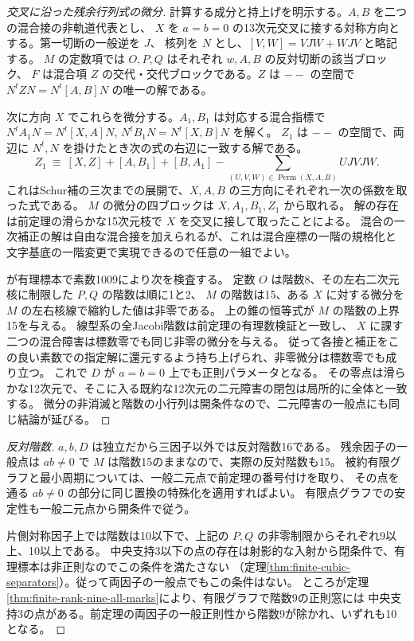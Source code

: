 \begin{proof}[交叉に沿った残余行列式の微分]
計算する成分と持上げを明示する。$A,B$ を二つの混合接の非軌道代表とし、
$X$ を $a=b=0$ の13次元交叉に接する対称方向とする。第一切断の一般逆を $J$、
核列を $N$ とし、$[V,W]=VJW+WJV$ と略記する。
$M$ の定数項では $O,P,Q$ はそれぞれ $w,A,B$ の反対切断の該当ブロック、
$F$ は混合項 $Z$ の交代・交代ブロックである。$Z$ は $--$ の空間で
$N^t ZN=N^t[A,B]N$ の唯一の解である。

次に方向 $X$ でこれらを微分する。$A_1,B_1$ は対応する混合指標で
$N^t A_1 N=N^t[X,A]N$, $N^t B_1N=N^t[X,B]N$ を解く。
$Z_1$ は $--$ の空間で、両辺に $N^t, N$ を掛けたとき次の式の右辺に一致する解である。
\[
 Z_1\ \equiv\ [X,Z]+[A,B_1]+[B,A_1]
          -\sum_{(U,V,W)\in\operatorname{Perm}(X,A,B)} UJVJW .
\]
これはSchur補の三次までの展開で、$X,A,B$ の三方向にそれぞれ一次の係数を取った式である。
$M$ の微分の四ブロックは $X,A_1,B_1,Z_1$ から取れる。
解の存在は前定理の滑らかな15次元枝で $X$ を交叉に接して取ったことによる。
混合の一次補正の解は自由な混合接を加えられるが、これは混合座標の一階の規格化と
文字基底の一階変更で実現できるので任意の一組でよい。

が有理標本で素数1009により次を検査する。
定数 $O$ は階数8、その左右二次元核に制限した $P,Q$ の階数は順に1と2、
$M$ の階数は15、ある $X$ に対する微分を $M$ の左右核線で縮約した値は非零である。
上の錐の恒等式が $M$ の階数の上界15を与える。
線型系の全Jacobi階数は前定理の有理数検証と一致し、
$X$ に課す二つの混合障害は標数零でも同じ非零の微分を与える。
従って各接と補正をこの良い素数での指定解に還元するよう持ち上げられ、非零微分は標数零でも成り立つ。
これで $D$ が $a=b=0$ 上でも正則パラメータとなる。
その零点は滑らかな12次元で、そこに入る既約な12次元の二元障害の閉包は局所的に全体と一致する。
微分の非消滅と階数の小行列は開条件なので、二元障害の一般点にも同じ結論が延びる。
\end{proof}
\begin{proof}[反対階数]
$a,b,D$ は独立だから三因子以外では反対階数16である。
残余因子の一般点は $ab\ne0$ で $M$ は階数15のままなので、実際の反対階数も15。
被約有限グラフと最小周期については、一般二元点で前定理の番号付けを取り、
その点を通る $ab\ne0$ の部分に同じ置換の特殊化を適用すればよい。
有限点グラフでの安定性も一般二元点から開条件で従う。

片側対称因子上では階数は10以下で、上記の $P,Q$ の非零制限からそれぞれ9以上、10以上である。
中央支持3以下の点の存在は射影的な入射から閉条件で、有理標本は非正則なのでこの条件を満たさない
（定理\ref{thm:finite-cubic-separators}）。従って両因子の一般点でもこの条件はない。
ところが定理\ref{thm:finite-rank-nine-all-marks}により、有限グラフで階数9の正則窓には
中央支持3の点がある。前定理の両因子の一般正則性から階数9が除かれ、いずれも10となる。
\end{proof}
